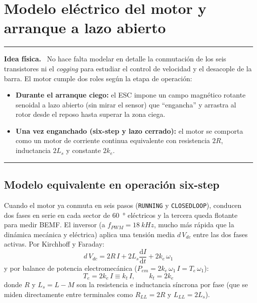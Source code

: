 \documentclass[11pt,a4paper,oneside]{report}
\theoremstyle{definition}
\theoremstyle{remark}
\newenvironment{idea}%
  {\par\medskip\noindent\begin{minipage}{\linewidth}\hrule\smallskip
   \noindent\textbf{Idea física.}\ }%
  {\smallskip\hrule\end{minipage}\par\medskip}
\newcommand{\dd}{\mathrm{d}}
\begin{document}
\chapter{Modelo eléctrico del motor y arranque a lazo abierto}\label{cap:bldc}

\begin{idea}
No hace falta modelar en detalle la conmutación de los seis transistores ni el
\emph{cogging} para estudiar el control de velocidad y el desacople de la
barra. El motor cumple dos roles según la etapa de operación:
\begin{itemize}
  \item \textbf{Durante el arranque ciego:} el ESC impone un campo magnético
        rotante senoidal a lazo abierto (sin mirar el sensor) que ``engancha'' y
        arrastra al rotor desde el reposo hasta superar la zona ciega.
  \item \textbf{Una vez enganchado (six-step y lazo cerrado):} el motor se
        comporta como un motor de corriente continua equivalente con resistencia
        $2R$, inductancia $2L_s$ y constante $2k_e$.
\end{itemize}
\end{idea}

\section{Modelo equivalente en operación six-step}
Cuando el motor ya conmuta en seis pasos (\texttt{RUNNING} y
\texttt{CLOSEDLOOP}), conducen dos fases en serie en cada sector de
\SI{60}{\degree} eléctricos y la tercera queda flotante para medir BEMF. El
inversor (a $f_{PWM}=\SI{18}{kHz}$, mucho más rápida que la dinámica mecánica y
eléctrica) aplica una tensión media $d\,V_{dc}$ entre las dos fases activas. Por
Kirchhoff y Faraday:
\begin{equation}
  \boxed{\;d\,V_{dc} = 2R\,I + 2L_s\frac{\dd I}{\dd t} + 2k_e\,\omega_1\;}
  \label{eq:dcequiv}
\end{equation}
y por balance de potencia electromecánica ($P_{em} = 2k_e\,\omega_1\,I = T_e\,\omega_1$):
\begin{equation}
  \boxed{\;T_e = 2k_e\,I \equiv k_t\,I,\qquad k_t = 2k_e\;}
  \label{eq:torque_dc}
\end{equation}
donde $R$ y $L_s=L-M$ son la resistencia e inductancia síncrona por fase (que
se miden directamente entre terminales como $R_{LL}=2R$ y $L_{LL}=2L_s$).
\end{document}
